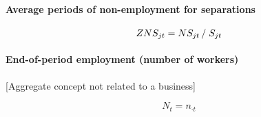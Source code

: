 \paragraph{Average periods of non-employment for separations}

\begin{equation}
ZNS_{jt} = {NS_{jt} } \left/ {\vphantom {{NS_{jt} } {S_{jt} }}} \right. {%
S_{jt} }
\end{equation}

\paragraph{End-of-period employment (number of workers)}

[Aggregate concept not related to a business]

\begin{equation}
N_t = n_{\cdot t}
\end{equation}

